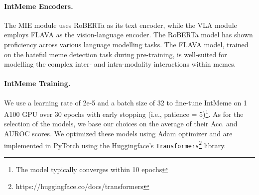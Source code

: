 \paragraph{IntMeme Encoders.} 
The MIE module uses RoBERTa as its text encoder, while the VLA module employs FLAVA as the vision-language encoder. The RoBERTa model has shown proficiency across various language modelling tasks. The FLAVA model, trained on the hateful meme detection task during pre-training, is well-suited for modelling the complex inter- and intra-modality interactions within memes.

\paragraph{IntMeme Training.} 
We use a learning rate of 2e-5 and a batch size of 32 to fine-tune \textsf{IntMeme} on 1 A100 GPU over 30 epochs with early stopping (i.e., patience = 5)\footnote{The model typically converges within 10 epochs}. As for the selection of the models, we base our choices on the average of their Acc. and AUROC scores. We optimized these models using Adam optimizer \cite{kingma2015adam} and are implemented in PyTorch using the Huggingface's \texttt{Transformers}\footnote{https://huggingface.co/docs/transformers} library.



